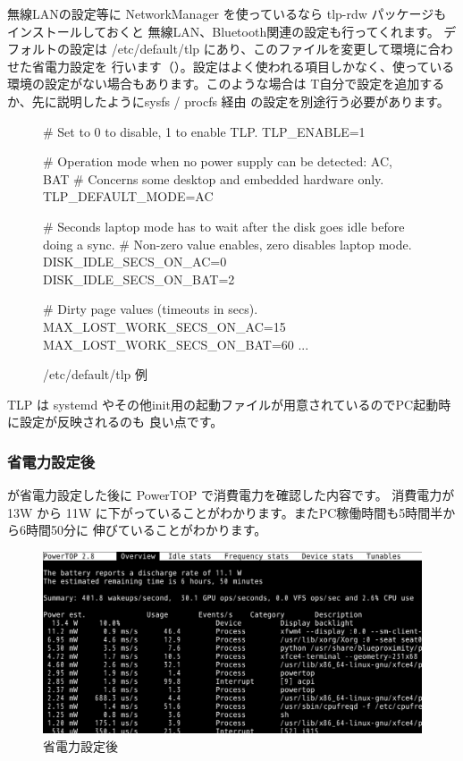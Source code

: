 \documentclass[mingoth,a4paper]{jsarticle}
\begin{document}

無線LANの設定等に NetworkManager を使っているなら tlp-rdw パッケージもインストールしておくと
無線LAN、Bluetooth関連の設定も行ってくれます。
デフォルトの設定は /etc/default/tlp にあり、このファイルを変更して環境に合わせた省電力設定を
行います（）。設定はよく使われる項目しかなく、使っている環境の設定がない場合もあります。このような場合は
T自分で設定を追加するか、先に説明したようにsysfs / procfs 経由
の設定を別途行う必要があります。


\begin{figure}[H]
\begin{center}
\begin{commandline}
# Set to 0 to disable, 1 to enable TLP.
TLP_ENABLE=1

# Operation mode when no power supply can be detected: AC, BAT
# Concerns some desktop and embedded hardware only.
TLP_DEFAULT_MODE=AC

# Seconds laptop mode has to wait after the disk goes idle before doing a sync.
# Non-zero value enables, zero disables laptop mode.
DISK_IDLE_SECS_ON_AC=0
DISK_IDLE_SECS_ON_BAT=2

# Dirty page values (timeouts in secs).
MAX_LOST_WORK_SECS_ON_AC=15
MAX_LOST_WORK_SECS_ON_BAT=60
...
\end{commandline}
\end{center}
\caption{/etc/default/tlp 例} 
\label{fig:TLP}
\end{figure}

TLP は systemd やその他init用の起動ファイルが用意されているのでPC起動時に設定が反映されるのも
良い点です。

\subsubsection{省電力設定後}
が省電力設定した後に PowerTOP で消費電力を確認した内容です。
消費電力が13W から 11W に下がっていることがわかります。またPC稼働時間も5時間半から6時間50分に
伸びていることがわかります。

\begin{figure}[H]
\begin{center}
\includegraphics[width=0.5\hsize]{image201602/powertop_02.png}
\end{center}
\caption{省電力設定後} 
\label{fig:powertop2}
\end{figure}
\end{document}
